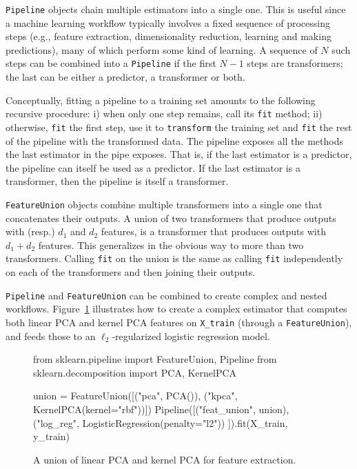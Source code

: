\documentclass[twocolumn]{article}
\begin{document}
\texttt{Pipeline} objects chain multiple estimators into a single one. This is
useful since a machine learning workflow typically involves a fixed sequence of
processing steps (e.g., feature extraction, dimensionality reduction, learning
and making predictions), many of which perform some kind of learning.
A sequence of $N$ such steps can be combined into a
\texttt{Pipeline} if the first $N-1$ steps are transformers; the last can be
either a predictor, a transformer or both.

Conceptually, fitting a pipeline to
a training set amounts to the following recursive procedure: i) when only one
step remains, call its \texttt{fit} method; ii) otherwise, \texttt{fit} the
first step, use it to \texttt{transform} the training set and \texttt{fit} the
rest of the pipeline with the transformed data. The pipeline exposes all the
methods the last estimator in the pipe exposes. That is, if the last estimator
is a predictor, the pipeline can itself be used as a predictor. If the last
estimator is a transformer, then the pipeline is itself a transformer.

\texttt{FeatureUnion} objects combine multiple transformers into a single one
that concatenates their outputs. A union of two transformers that
produce outputs with (resp.) $d_1$ and $d_2$ features, is
a transformer that produces outputs with $d_1 + d_2$ features.
This generalizes in the obvious way to more than two transformers.
Calling \texttt{fit} on the union is the same as calling \texttt{fit}
independently on each of the transformers and then joining their outputs.

\texttt{Pipeline} and \texttt{FeatureUnion} can be
combined to create complex and nested workflows.
Figure~\ref{pca-union} illustrates how to create a complex estimator
that computes both linear PCA and kernel PCA features on \texttt{X\_train}
(through a \texttt{FeatureUnion}),
and feeds those to an $\ell_2$-regularized logistic regression model.

\begin{figure*}[t]
\begin{pythoncode}
from sklearn.pipeline import FeatureUnion, Pipeline
from sklearn.decomposition import PCA, KernelPCA

union = FeatureUnion([("pca", PCA()),
                      ("kpca", KernelPCA(kernel="rbf"))])
Pipeline([("feat_union", union),
          ("log_reg", LogisticRegression(penalty="l2"))
         ]).fit(X_train, y_train)
\end{pythoncode}
\caption{A union of linear PCA and kernel PCA for feature extraction.}
\label{pca-union}
\end{figure*}
\end{document}
